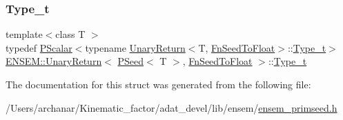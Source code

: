 \subsubsection{\texorpdfstring{Type\_t}{Type\_t}\hspace{0.1cm}{\footnotesize\ttfamily [2/2]}}
{\footnotesize\ttfamily template$<$class T $>$ \\
typedef \mbox{\hyperlink{classENSEM_1_1PScalar}{P\+Scalar}}$<$typename \mbox{\hyperlink{structENSEM_1_1UnaryReturn}{Unary\+Return}}$<$T, \mbox{\hyperlink{structENSEM_1_1FnSeedToFloat}{Fn\+Seed\+To\+Float}}$>$\+::\mbox{\hyperlink{structENSEM_1_1UnaryReturn_3_01PSeed_3_01T_01_4_00_01FnSeedToFloat_01_4_a0162324945d4cff5d69aa1ee87641522}{Type\+\_\+t}}$>$ \mbox{\hyperlink{structENSEM_1_1UnaryReturn}{E\+N\+S\+E\+M\+::\+Unary\+Return}}$<$ \mbox{\hyperlink{classENSEM_1_1PSeed}{P\+Seed}}$<$ T $>$, \mbox{\hyperlink{structENSEM_1_1FnSeedToFloat}{Fn\+Seed\+To\+Float}} $>$\+::\mbox{\hyperlink{structENSEM_1_1UnaryReturn_3_01PSeed_3_01T_01_4_00_01FnSeedToFloat_01_4_a0162324945d4cff5d69aa1ee87641522}{Type\+\_\+t}}}



The documentation for this struct was generated from the following file\+:\begin{DoxyCompactItemize}
\item 
/\+Users/archanar/\+Kinematic\+\_\+factor/adat\+\_\+devel/lib/ensem/\mbox{\hyperlink{lib_2ensem_2ensem__primseed_8h}{ensem\+\_\+primseed.\+h}}\end{DoxyCompactItemize}
